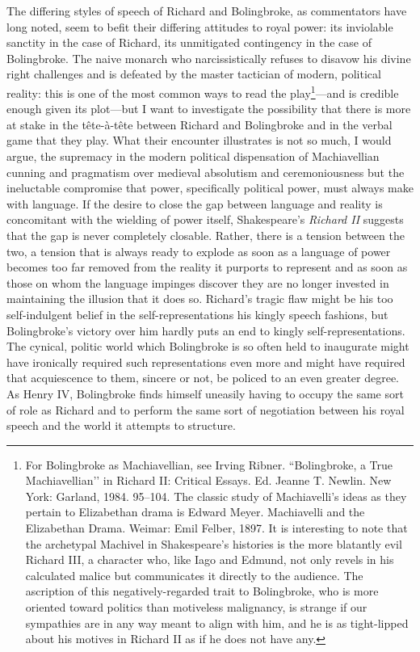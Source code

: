 The differing styles of speech of Richard and Bolingbroke, as commentators have long noted, seem to befit their differing attitudes to royal power: its inviolable sanctity in the case of Richard, its unmitigated contingency in the case of Bolingbroke.
The naive monarch who narcissistically refuses to disavow his divine right challenges and is defeated by the master tactician of modern, political reality: this is one of the most common ways to read the play\footnote{For Bolingbroke as Machiavellian, see Irving Ribner. ``Bolingbroke, a True Machiavellian’’ in Richard II: Critical Essays. Ed. Jeanne T. Newlin. New York: Garland, 1984. 95--104.
The classic study of Machiavelli’s ideas as they pertain to Elizabethan drama is Edward Meyer.
Machiavelli and the Elizabethan Drama.
Weimar: Emil Felber, 1897.
It is interesting to note that the archetypal Machivel in Shakespeare’s histories is the more blatantly evil Richard III, a character who, like Iago and Edmund, not only revels in his calculated malice but communicates it directly to the audience.
The ascription of this negatively-regarded trait to Bolingbroke, who is more oriented toward politics than motiveless malignancy, is strange if our sympathies are in any way meant to align with him, and he is as tight-lipped about his motives in Richard II as if he does not have any.}---and is credible enough given its plot---but I want to investigate the possibility that there is more at stake in the tête-à-tête between Richard and Bolingbroke and in the verbal game that they play.
What their encounter illustrates is not so much, I would argue, the supremacy in the modern political dispensation of Machiavellian cunning and pragmatism over medieval absolutism and ceremoniousness but the ineluctable compromise that power, specifically political power, must always make with language.
If the desire to close the gap between language and reality is concomitant with the wielding of power itself, Shakespeare’s \emph{Richard II} suggests that the gap is never completely closable.
Rather, there is a tension between the two, a tension that is always ready to explode as soon as a language of power becomes too far removed from the reality it purports to represent and as soon as those on whom the language impinges discover they are no longer invested in maintaining the illusion that it does so.
Richard’s tragic flaw might be his too self-indulgent belief in the self-representations his kingly speech fashions, but Bolingbroke’s victory over him hardly puts an end to kingly self-representations.
The cynical, politic world which Bolingbroke is so often held to inaugurate might have ironically required such representations even more and might have required that acquiescence to them, sincere or not, be policed to an even greater degree.
As Henry IV, Bolingbroke finds himself uneasily having to occupy the same sort of role as Richard and to perform the same sort of negotiation between his royal speech and the world it attempts to structure.

